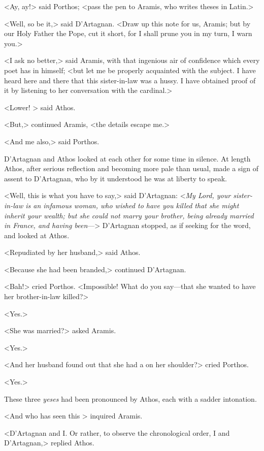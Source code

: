 <Ay, ay!> said Porthos; <pass the pen to Aramis, who writes theses in Latin.> 

<Well, so be it,> said D'Artagnan. <Draw up this note for us, Aramis; but by our Holy Father the Pope, cut it short, for I shall prune you in my turn, I warn you.> 

<I ask no better,> said Aramis, with that ingenious air of confidence which every poet has in himself; <but let me be properly acquainted with the subject. I have heard here and there that this sister-in-law was a hussy. I have obtained proof of it by listening to her conversation with the cardinal.> 

<Lower! > said Athos. 

<But,> continued Aramis, <the details escape me.> 

<And me also,> said Porthos. 

D'Artagnan and Athos looked at each other for some time in silence. At length Athos, after serious reflection and becoming more pale than usual, made a sign of assent to D'Artagnan, who by it understood he was at liberty to speak. 

<Well, this is what you have to say,> said D'Artagnan: <\textit{My Lord, your sister-in-law is an infamous woman, who wished to have you killed that she might inherit your wealth; but she could not marry your brother, being already married in France, and having been}—> D'Artagnan stopped, as if seeking for the word, and looked at Athos. 

<Repudiated by her husband,> said Athos. 

<Because she had been branded,> continued D'Artagnan. 

<Bah!> cried Porthos. <Impossible! What do you say—that she wanted to have her brother-in-law killed?> 

<Yes.> 

<She was married?> asked Aramis. 

<Yes.> 

<And her husband found out that she had a  on her shoulder?> cried Porthos. 

<Yes.> 

These three \emph{yeses} had been pronounced by Athos, each with a sadder intonation. 

<And who has seen this > inquired Aramis. 

<D'Artagnan and I. Or rather, to observe the chronological order, I and D'Artagnan,> replied Athos. 

